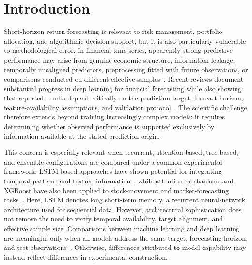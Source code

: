 \documentclass[utf8]{FrontiersinHarvard} %
\newcommand{\rev}[1]{{\color{red}#1}}
\begin{document}
\section{Introduction}
\label{sec:introduction}

Short-horizon return forecasting is relevant to risk management, portfolio allocation, and algorithmic decision support, but it is also particularly vulnerable to methodological error. In financial time series, apparently strong predictive performance may arise from genuine economic structure, information leakage, temporally misaligned predictors, preprocessing fitted with future observations, or comparisons conducted on different effective samples~\citep{Kaufman2012}. Recent reviews document substantial progress in deep learning for financial forecasting while also showing that reported results depend critically on the prediction target, forecast horizon, feature-availability assumptions, and validation protocol~\citep{Zhang2024review}. The scientific challenge therefore extends beyond training increasingly complex models: it requires determining whether observed performance is supported exclusively by information available at the stated prediction origin.

This concern is especially relevant when recurrent, attention-based, tree-based, and ensemble configurations are compared under a common experimental framework. LSTM-based approaches have shown potential for integrating temporal patterns and textual information~\citep{Usmani2023,John2023}, while attention mechanisms and XGBoost have also been applied to stock-movement and market-forecasting tasks~\citep{Zhang2022transformer,Gao2025xgboost,Shen2025xgboost}. \rev{Here, LSTM denotes long short-term memory, a recurrent neural-network architecture used for sequential data.} However, architectural sophistication does not remove the need to verify temporal availability, target alignment, and effective sample size. Comparisons between machine learning and deep learning are meaningful only when all models address the same target, forecasting horizon, and test observations~\citep{Nikou2019,Shobayo2025}. Otherwise, differences attributed to model capability may instead reflect differences in experimental construction.
\end{document}
